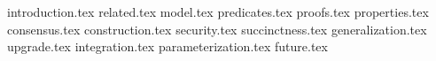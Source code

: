 {introduction.tex}
{related.tex}
{model.tex}
{predicates.tex}
{proofs.tex}
{properties.tex}
{consensus.tex}
{construction.tex}
{security.tex}
{succinctness.tex}
{generalization.tex}
{upgrade.tex}
{integration.tex}
{parameterization.tex}
{future.tex}
